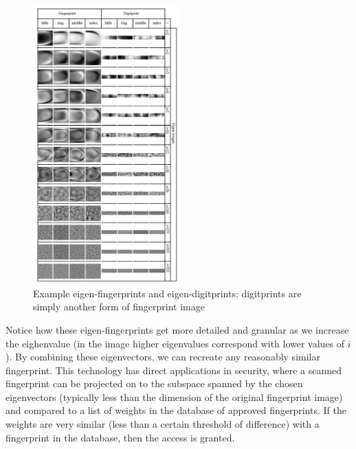 \documentclass[12pt]{report}
\begin{document}
            \begin{figure}[H]
                \centering
                \includegraphics[width=0.5\textwidth]{eigenfingerprints.png}
                \caption{Example eigen-fingerprints and eigen-digitprints; digitprints are simply another form of fingerprint image \cite{Pavesic2022}}
            \end{figure}

            Notice how these eigen-fingerprints get more detailed and granular as we increase the eighenvalue (in the image higher eigenvalues correspond with lower values of $i$). By combining these eigenvectors, we can recreate any reasonably similar fingerprint. This technology has direct applications in security, where a scanned fingerprint can be projected on to the subspace spanned by the chosen eigenvectors (typically less than the dimension of the original fingerprint image) and compared to a list of weights in the database of approved fingerprints. If the weights are very similar (less than a certain threshold of difference) with a fingerprint in the database, then the access is granted.
\end{document}
